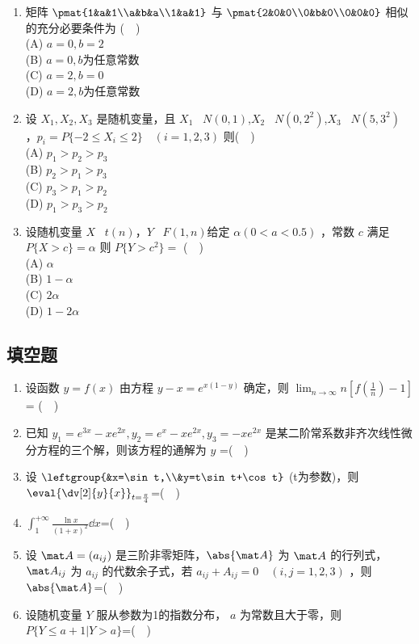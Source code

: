 \begin{enumerate}
\item  矩阵 $\pmat{1&a&1\\a&b&a\\1&a&1}$ 与 $\pmat{2&0&0\\0&b&0\\0&0&0}$ 相似的充分必要条件为 ($\quad$)\\
(A) $a=0,b=2$\\
(B) $a=0,b$为任意常数\\
(C) $a=2,b=0$\\
(D) $a=2,b$为任意常数
\item  设 $X_1,X_2,X_3$ 是随机变量，且 $X_1 $~ $N(0,1)$,$X_2 $~ $N(0,2^2)$,$X_3 $~ $N(5,3^2)$ ，$p_i=P\{-2 \le X_i \le2\}\quad  (i=1,2,3)$ 则($\quad$)\\
(A)  $p_1>p_2>p_3$\\
(B)  $p_2>p_1>p_3$\\
(C)  $p_3>p_1>p_2$\\
(D) $p_1>p_3>p_2$\\
\item 设随机变量 $X$~ $t(n)$，$Y$~ $F(1,n)$给定 $\alpha(0<a<0.5)$ ，常数 $c$ 满足 $P\{X>c\}=\alpha$  则  $P\{Y>c^2\}=$ ($\quad$)\\
(A) $\alpha$\\
(B) $1-\alpha$\\
(C) $2\alpha$\\
(D) $1-2\alpha $
\end{enumerate}
\subsection{填空题}
\begin{enumerate}
\item 设函数 $y=f(x)$ 由方程 $y-x=e^{x(1-y)}$ 确定，则  $\displaystyle \lim_{n\to\infty} n[f(\frac{1}{n})-1]$ = ($\quad$)
\item  已知 $y_1=e^{3x}-xe^{2x},y_2=e^x-xe^{2x},y_3=-xe^{2x}$  是某二阶常系数非齐次线性微分方程的三个解，则该方程的通解为 $y$ =($\quad$)
\item  设
$\leftgroup{&x=\sin t,\\&y=t\sin t+\cos t}$  (t为参数)，则$\displaystyle \eval{ \dv[2]{y}{x}}_{t =\frac{\pi}{4}}$=($\quad$)
\item $\displaystyle \int_{1}^{+\infty }\frac{\ln x}{(1+x)^2}\dd{x}$=($\quad$)
\item 设 $\mat A=(a_{ij}) $ 是三阶非零矩阵，$\abs{\mat A}$   为 $\mat A$ 的行列式，$\mat A_{ij}$  为 $a_{ij}$ 的代数余子式，若 $a_{ij}+A_{ij}=0 \quad (i,j=1,2,3)$ ，则 $\abs{\mat A}$=($\quad$)
\item 设随机变量 $Y$ 服从参数为1的指数分布， $a$ 为常数且大于零，则  $P\{Y \le a+1|Y>a\}$=($\quad$)
\end{enumerate}
